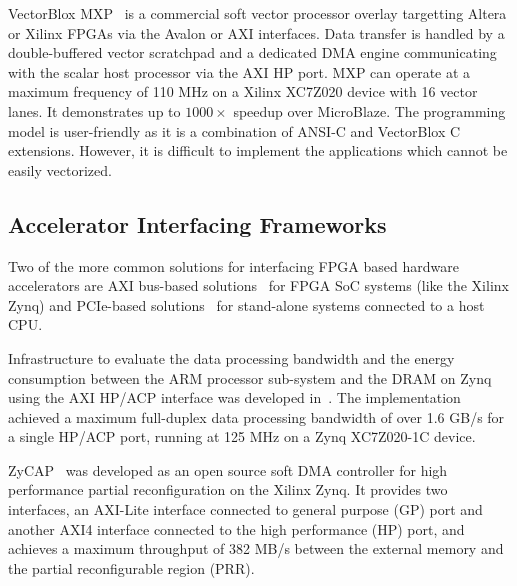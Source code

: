VectorBlox MXP~\cite{severance2013embedded} is a commercial soft vector processor overlay targetting Altera or Xilinx FPGAs via the Avalon or AXI interfaces. 
Data transfer is handled by a double-buffered vector scratchpad and a dedicated DMA engine communicating with the scalar host processor via the AXI HP port. 
MXP can operate at a maximum frequency of 110 MHz on a Xilinx XC7Z020 device with 16 vector lanes. 
It demonstrates up to $1000\times$ speedup over MicroBlaze. 
The programming model is user-friendly as it is a combination of ANSI-C and VectorBlox C extensions.  
However, it is difficult to implement the applications which cannot be easily vectorized. 


\subsection{Accelerator Interfacing Frameworks} 
Two of the more common solutions for interfacing FPGA based hardware accelerators are AXI bus-based solutions~\cite{vipin2014zycap, sadri2013energy, xillybus2018} for FPGA SoC systems (like the Xilinx Zynq) and PCIe-based solutions~\cite{xillybus2018, vipin2014dyract, gong2014efficient, jacobsen2015riffa} for stand-alone systems connected to a host CPU. 

Infrastructure to evaluate the data processing bandwidth and the energy consumption between the ARM processor sub-system and the DRAM on Zynq using the AXI HP/ACP interface was developed in~\cite{sadri2013energy}.
The implementation achieved a maximum full-duplex data processing bandwidth of over 1.6 GB/s for a single HP/ACP port, running at 125 MHz on a Zynq XC7Z020-1C device.

ZyCAP~\cite{vipin2014zycap} was developed as an open source soft DMA controller for high performance partial reconfiguration on the Xilinx Zynq. 
It provides two interfaces, an AXI-Lite interface connected to general purpose (GP) port and another AXI4 interface connected to the high performance (HP) port, and achieves a maximum throughput of 382 MB/s between the external memory and the partial reconfigurable region (PRR). 



